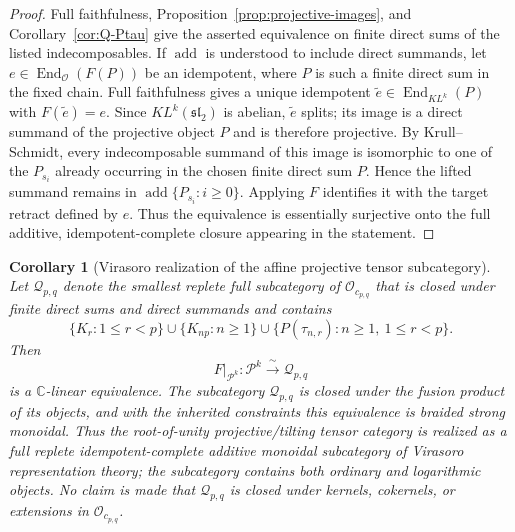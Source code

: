 \documentclass[12pt,leqno]{amsart}
\numberwithin{equation}{section}
\newtheorem{cor}[thm]{Corollary}
\newcommand{\End}{\operatorname{End}}
\newcommand{\KL}{KL}
\newcommand{\Oc}{\mathcal O}
\def\C{\mathbb{C}}
\begin{document}
\begin{proof}
Full faithfulness, Proposition~\ref{prop:projective-images}, and
Corollary~\ref{cor:Q-Ptau} give the asserted equivalence on finite direct
sums of the listed indecomposables.  If $\operatorname{add}$ is understood
to include direct summands, let $e\in\End_{\Oc}(F(P))$ be an idempotent,
where $P$ is such a finite direct sum in the fixed chain.  Full
faithfulness gives a unique idempotent
$\widetilde e\in\End_{\KL^k}(P)$ with $F(\widetilde e)=e$.  Since
$\KL^k(\mathfrak{sl}_2)$ is abelian, $\widetilde e$ splits; its image is a
direct summand of the projective object $P$ and is therefore projective.
By Krull--Schmidt, every indecomposable summand of this image is
isomorphic to one of the $P_{s_i}$ already occurring in the chosen
finite direct sum $P$.  Hence the lifted summand remains in
$\operatorname{add}\{P_{s_i}:i\ge0\}$.  Applying $F$ identifies it with
the target retract defined by $e$.  Thus the equivalence is essentially
surjective onto the full additive, idempotent-complete closure appearing
in the statement.
\end{proof}

\begin{cor}[Virasoro realization of the affine projective tensor subcategory]
\label{cor:projective-essential-image}
Let $\mathcal Q_{p,q}$ denote the smallest replete full subcategory of
$\Oc_{c_{p,q}}$ that is closed under finite direct sums and direct summands
and contains
\[
 \{K_r:1\le r<p\}
 \cup\{K_{np}:n\ge1\}
 \cup\{P(\tau_{n,r}):n\ge1,\ 1\le r<p\}.
\]
Then
\[
 F|_{\mathcal P^k}:\mathcal P^k\xrightarrow{\ \sim\ }\mathcal Q_{p,q}
\]
is a $\C$-linear equivalence.  The subcategory $\mathcal Q_{p,q}$ is
closed under the fusion product of its objects, and with the inherited
constraints this equivalence is braided strong monoidal.  Thus the
root-of-unity projective/tilting tensor category is realized as a full
replete idempotent-complete additive monoidal subcategory of Virasoro
representation theory; the subcategory contains both ordinary and
logarithmic objects.  No claim is made that $\mathcal Q_{p,q}$ is closed
under kernels, cokernels, or extensions in $\Oc_{c_{p,q}}$.
\end{cor}
\end{document}
